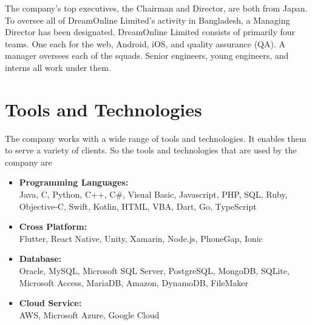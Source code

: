 \begin{flushleft}
The company's top executives, the Chairman and Director, are both from Japan. To oversee all
of DreamOnline Limited's activity in Bangladesh, a Managing Director has been designated.
DreamOnline Limited consists of primarily four teams. One each for the web, Android, iOS, and
quality assurance (QA). A manager oversees each of the squads. Senior engineers, young
engineers, and interns all work under them.
\end{flushleft}




\section{Tools and Technologies}
\begin{flushleft}
    The company works with a wide range of tools and technologies. It enables them to serve a
variety of clients. So the tools and technologies that are used by the company are\\
\vspace{12pt}
\begin{itemize}
    \item \textbf{Programming Languages:}\\
    \vspace{6pt}
Java, C, Python, C++, C#, Visual Basic, Javascript, PHP, SQL, Ruby, Objective-C, Swift,
Kotlin, HTML, VBA, Dart, Go, TypeScript\\
    \item \textbf{Cross Platform:}\\
    \vspace{6pt}
Flutter, React Native, Unity, Xamarin, Node.js, PhoneGap, Ionic\\
    \item \textbf{Database:}\\
    \vspace{6pt}
Oracle, MySQL, Microsoft SQL Server, PostgreSQL, MongoDB, SQLite, Microsoft
Access, MariaDB, Amazon, DynamoDB, FileMaker\\
    \item \textbf{Cloud Service:}\\
    \vspace{6pt}
AWS, Microsoft Azure, Google Cloud
\end{itemize}



\end{flushleft}
